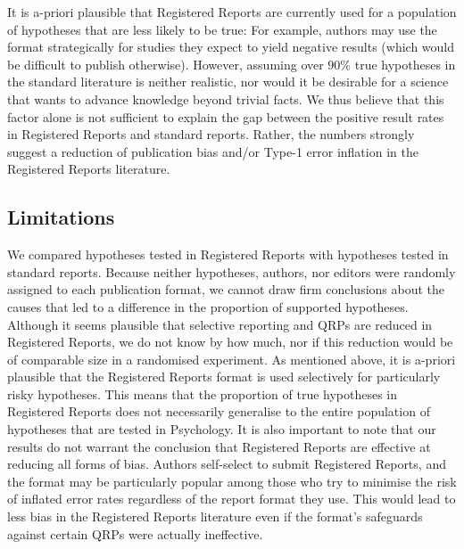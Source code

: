 \documentclass[british,,jou,floatsintext]{apa6}
\begin{document}
It is a-priori plausible that Registered Reports are currently used for a population of hypotheses that are less likely to be true:
For example, authors may use the format strategically for studies they expect to yield negative results (which would be difficult to publish otherwise).
However, assuming over \(90\%\) true hypotheses in the standard literature is neither realistic, nor would it be desirable for a science that wants to advance knowledge beyond trivial facts.
We thus believe that this factor alone is not sufficient to explain the gap between the positive result rates in Registered Reports and standard reports.
Rather, the numbers strongly suggest a reduction of publication bias and/or Type-1 error inflation in the Registered Reports literature.

\hypertarget{limitations}{%
\subsection{Limitations}\label{limitations}}

We compared hypotheses tested in Registered Reports with hypotheses tested in standard reports.
Because neither hypotheses, authors, nor editors were randomly assigned to each publication format, we cannot draw firm conclusions about the causes that led to a difference in the proportion of supported hypotheses.
Although it seems plausible that selective reporting and QRPs are reduced in Registered Reports, we do not know by how much, nor if this reduction would be of comparable size in a randomised experiment.
As mentioned above, it is a-priori plausible that the Registered Reports format is used selectively for particularly risky hypotheses.
This means that the proportion of true hypotheses in Registered Reports does not necessarily generalise to the entire population of hypotheses that are tested in Psychology.
It is also important to note that our results do not warrant the conclusion that Registered Reports are effective at reducing all forms of bias.
Authors self-select to submit Registered Reports, and the format may be particularly popular among those who try to minimise the risk of inflated error rates regardless of the report format they use.
This would lead to less bias in the Registered Reports literature even if the format's safeguards against certain QRPs were actually ineffective.
\end{document}

